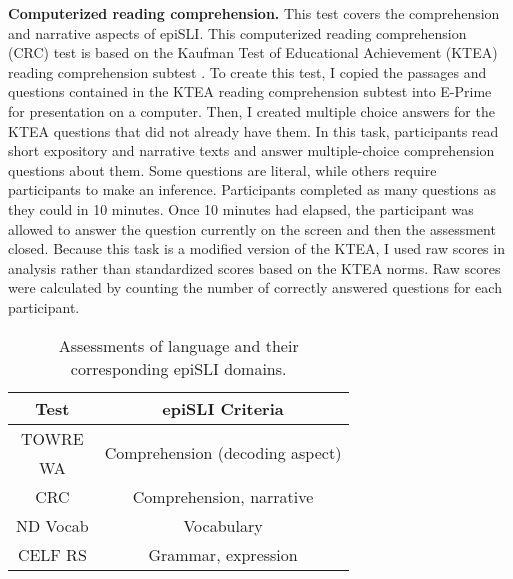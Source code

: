\documentclass[../dissertation.tex]{subfiles}
\begin{document}
	\textbf{Computerized reading comprehension.} This test covers the comprehension and narrative aspects of epiSLI. This computerized reading comprehension (CRC) test is based on the Kaufman Test of Educational Achievement (KTEA) reading comprehension subtest \citep{Kaufman2004}. To create this test, I copied the passages and questions contained in the KTEA reading comprehension subtest into E-Prime \citep{schneider2002prime} for presentation on a computer. Then, I created multiple choice answers for the KTEA questions that did not already have them. In this task, participants read short expository and narrative texts and answer multiple-choice comprehension questions about them. Some questions are literal, while others require participants to make an inference. Participants completed as many questions as they could in 10 minutes. Once 10 minutes had elapsed, the participant was allowed to answer the question currently on the screen and then the assessment closed. Because this task is a modified version of the KTEA, I used raw scores in analysis rather than standardized scores based on the KTEA norms. Raw scores were calculated by counting the number of correctly answered questions for each participant.  \par
	
\begin{wraptable}[8]{R}{0.5\linewidth}
\caption{Assessments of language and their corresponding epiSLI domains.}
\vspace{-10pt}
\begin{center}
\begin{tabular}{ cc } 
 \toprule
 Test & epiSLI Criteria \\ 
 \midrule
 TOWRE & \multirow{2}{*}{Comprehension (decoding aspect)}\\ 
 WA & \\ 
 CRC & Comprehension, narrative \\
 ND Vocab & Vocabulary \\ 
 CELF RS & Grammar, expression \\ 
 \bottomrule 
\end{tabular}
\end{center}
\label{slitable}
\end{wraptable}
\end{document}
